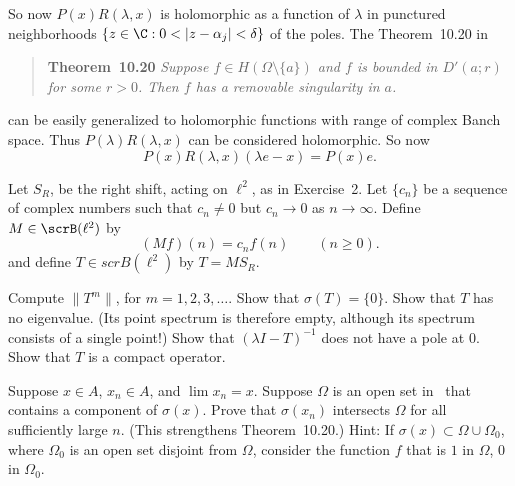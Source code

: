 \begin{enumerate}
So now \(P(x)R(\lambda,x)\) is holomorphic as a function of \(\lambda\)
in punctured neighborhoods \(\{z\in\C: 0 < |z - \alpha_j| < \delta\}\)
of the poles. The Theorem~10.20 in \cite{RudinRCA80}
\begin{quote}
\textbf{Theorem~10.20}
\textit{
Suppose \(f\in H(\Omega\setminus\{a\})\) and $f$ is bounded in \(D'(a;r)\)
for some \(r > 0\). Then $f$ has a removable singularity in $a$.
}
\end{quote}
can be easily
generalized to holomorphic functions with range of complex Banch space.
Thus \(P(\lambda) R(\lambda,x)\) can be considered holomorphic.
So now
\begin{equation*}
P(x)R(\lambda,x)(\lambda e - x) = P(x)e.
\end{equation*}


\unfinished

\begin{excopy}
Let \(S_R\), be the right shift, acting on \(\ell^2\),
as in Exercise~2. Let \(\{c_n\}\) be a sequence of
complex numbers such that \(c_n \neq 0\) but \(c_n\to 0\) as \(n\to\infty\).
 Define \(M \in \scrB(\ell^2)\) by
\begin{equation*}
(Mf)(n) = c_n f(n) \qquad (n \geq 0).
\end{equation*}
and define \(T \in scrB(\ell^2)\) by \(T = MS_R\).
\begin{itemize}
  Compute \(\|T^m\|\), for \(m = 1,2,3,\ldots\).
 Show that \(\sigma(T) = \{0\}\).
 Show that $T$ has no eigenvalue.
  (Its point spectrum is therefore empty,
  although its spectrum consists of a single point!)
 Show that \((\lambda I - T)^{-1}\) does not have a pole at $0$.
 Show that $T$ is a compact operator.
\end{itemize}
\end{excopy}
\unfinished

\begin{excopy}
Suppose \(x \in A\), \(x_n \in A\), and \(\lim x_n = x\).
  Suppose \(\Omega\) is an open set in \C\ that
contains a component of \(\sigma(x)\).
  Prove that \(\sigma(x_n)\) intersects \(\Omega\) for all sufficiently
large $n$. (This strengthens Theorem~10.20.) Hint:
  If \(\sigma(x) \subset \Omega \cup \Omega_0\), where \(\Omega_0\) is
an open set disjoint from \(\Omega\),
  consider the function $f$ that is $1$ in \(\Omega\), $0$ in \(\Omega_0\).
\end{excopy}
\unfinished

\begin{excopy}
\end{excopy}
\unfinished

\end{enumerate}
